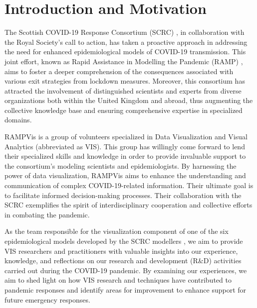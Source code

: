 \section{Introduction and Motivation}

The Scottish COVID-19 Response Consortium (SCRC) \cite{2020University}, in collaboration with the Royal Society's call to action, has taken a proactive approach in addressing the need for enhanced epidemiological models of COVID-19 transmission.
This joint effort, known as Rapid Assistance in Modelling the Pandemic (RAMP) \cite{2020Rapid}, aims to foster a deeper comprehension of the consequences associated with various exit strategies from lockdown measures.
Moreover, this consortium has attracted the involvement of distinguished scientists and experts from diverse organizations both within the United Kingdom and abroad, thus augmenting the collective knowledge base and ensuring comprehensive expertise in specialized domains.

RAMPVis \cite{2020Visualization} is a group of volunteers specialized in Data Visualization and Visual Analytics (abbreviated as VIS).
This group has willingly come forward to lend their specialized skills and knowledge in order to provide invaluable support to the consortium's modeling scientists and epidemiologists.
By harnessing the power of data visualization, RAMPVis aims to enhance the understanding and communication of complex COVID-19-related information.
Their ultimate goal is to facilitate informed decision-making processes.
Their collaboration with the SCRC exemplifies the spirit of interdisciplinary cooperation and collective efforts in combating the pandemic.

As the team responsible for the visualization component of one of the six epidemiological models developed by the SCRC modellers \cite{chen2022RAMPVIS}, we aim to provide VIS researchers and practitioners with valuable insights into our experience, knowledge, and reflections on our research and development (R\&D) activities carried out during the COVID-19 pandemic.
By examining our experiences, we aim to shed light on how VIS research and techniques have contributed to pandemic responses and identify areas for improvement to enhance support for future emergency responses.